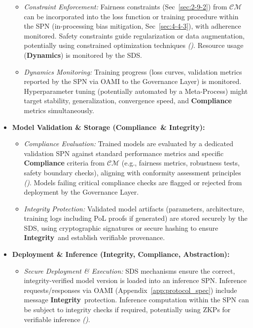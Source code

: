 \documentclass[12pt,a4paper]{report}
\renewcommand{\citep}[1]{\textit{\scriptsize{(\cite{#1})}}}
\newcommand{\Compliance}{\textbf{Compliance}}
\newcommand{\Integrity}{\textbf{Integrity}}
\newcommand{\Dynamics}{\textbf{Dynamics}}
\begin{document}
\begin{itemize}
\begin{itemize}
			\item \textit{Constraint Enforcement:} Fairness constraints (Sec~\ref{sec:2-9-2}) from $\mathcal{CM}$ can be incorporated into the loss function or training procedure within the SPN (in-processing bias mitigation, Sec~\ref{sec:4-4-3}), with adherence monitored. Safety constraints guide regularization or data augmentation, potentially using constrained optimization techniques \citep{Constraint_RL_Survey_2024}. Resource usage (\Dynamics) is monitored by the SDS.
			\item \textit{Dynamics Monitoring:} Training progress (loss curves, validation metrics reported by the SPN via OAMI to the Governance Layer) is monitored. Hyperparameter tuning (potentially automated by a Meta-Process) might target stability, generalization, convergence speed, and \textbf{Compliance} metrics simultaneously.
		\end{itemize}
		\item \textbf{Model Validation \& Storage (\Compliance\ \& \Integrity):}
		\begin{itemize}
			\item \textit{Compliance Evaluation:} Trained models are evaluated by a dedicated validation SPN against standard performance metrics and specific \textbf{Compliance} criteria from $\mathcal{CM}$ (e.g., fairness metrics, robustness tests, safety boundary checks), aligning with conformity assessment principles \citep{Navigating_AI_Conformity_2025}. Models failing critical compliance checks are flagged or rejected from deployment by the Governance Layer.
			\item \textit{Integrity Protection:} Validated model artifacts (parameters, architecture, training logs including PoL proofs if generated) are stored securely by the SDS, using cryptographic signatures or secure hashing to ensure \Integrity\ and establish verifiable provenance.
		\end{itemize}
		\item \textbf{Deployment \& Inference (Integrity, Compliance, Abstraction):}
		\begin{itemize}
			\item \textit{Secure Deployment \& Execution:} SDS mechanisms ensure the correct, integrity-verified model version is loaded into an inference SPN. Inference requests/responses via OAMI (Appendix~\ref{app:protocol_spec}) include message \Integrity\ protection. Inference computation within the SPN can be subject to integrity checks if required, potentially using ZKPs for verifiable inference \citep{Peng2025ZKMLSurvey}.

\end{itemize}
\end{itemize}
\end{document}
